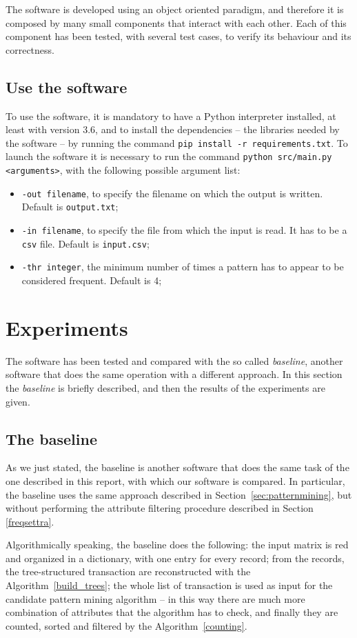 \documentclass{acm_proc_article-sp-sigmod09}
\begin{document}
The software is developed using an object oriented paradigm, and therefore it is composed by many small components that interact with each other. Each of this component has been tested, with several test cases, to verify its behaviour and its correctness.

\subsection{Use the software}
To use the software, it is mandatory to have a Python interpreter installed, at least with version 3.6, and to install the dependencies -- the libraries needed by the software -- by running the command \texttt{pip install -r requirements.txt}. To launch the software it is necessary to run the command \texttt{python src/main.py <arguments>}, with the following possible argument list:
\begin{itemize}
\item \texttt{-out filename}, to specify the filename on which the output is written. Default is \texttt{output.txt};
\item \texttt{-in filename}, to specify the file from which the input is read. It has to be a \texttt{csv} file. Default is \texttt{input.csv};
\item \texttt{-thr integer}, the minimum number of times a pattern has to appear to be considered frequent. Default is 4;
\end{itemize}
 
\section{Experiments}
The software has been tested and compared with the so called \emph{baseline}, another software that does the same operation with a different approach. In this section the \emph{baseline} is briefly described, and then the results of the experiments are given.

\subsection{The baseline}
As we just stated, the baseline is another software that does the same task of the one described in this report, with which our software is compared. In particular, the baseline uses the same approach described in Section~\ref{sec:patternmining}, but without performing the attribute filtering procedure described in Section \ref{freqsettra}.

Algorithmically speaking, the baseline does the following: the input matrix is red and organized in a dictionary, with one entry for every record; from the records, the tree-structured transaction are reconstructed with the Algorithm~\ref{build_trees}; the whole list of transaction is used as input for the candidate pattern mining algorithm -- in this way there are much more combination of attributes that the algorithm has to check, and finally they are counted, sorted and filtered by the Algorithm~\ref{counting}.
\end{document}
